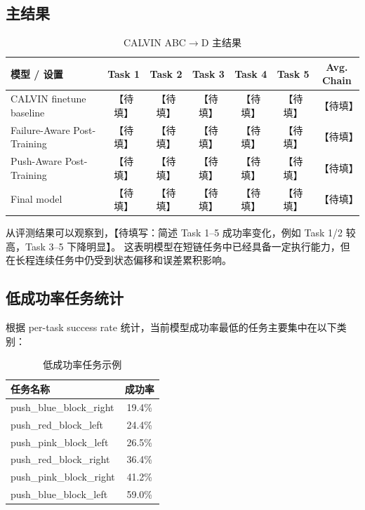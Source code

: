 \documentclass[10pt,a4paper,fontset=none]{ctexart}
\newcommand{\todo}[1]{\textcolor{TodoRed}{【#1】}}
\begin{document}
\subsection{主结果}

\begin{table}[H]
\centering
\caption{CALVIN ABC$\rightarrow$D 主结果}
\small
\begin{tabularx}{\textwidth}{>{\raggedright\arraybackslash}Xcccccc}
\toprule
模型 / 设置 & Task 1 & Task 2 & Task 3 & Task 4 & Task 5 & \makecell{Avg.\\Chain} \\
\midrule
CALVIN finetune baseline & \todo{待填} & \todo{待填} & \todo{待填} & \todo{待填} & \todo{待填} & \todo{待填} \\
Failure-Aware Post-Training & \todo{待填} & \todo{待填} & \todo{待填} & \todo{待填} & \todo{待填} & \todo{待填} \\
Push-Aware Post-Training & \todo{待填} & \todo{待填} & \todo{待填} & \todo{待填} & \todo{待填} & \todo{待填} \\
Final model & \todo{待填} & \todo{待填} & \todo{待填} & \todo{待填} & \todo{待填} & \todo{待填} \\
\bottomrule
\end{tabularx}
\end{table}

从评测结果可以观察到，\todo{待填写：简述 Task 1--5 成功率变化，例如 Task 1/2 较高，Task 3--5 下降明显}。
这表明模型在短链任务中已经具备一定执行能力，但在长程连续任务中仍受到状态偏移和误差累积影响。

\subsection{低成功率任务统计}

根据 per-task success rate 统计，当前模型成功率最低的任务主要集中在以下类别：

\begin{table}[H]
\centering
\caption{低成功率任务示例}
\begin{tabularx}{0.82\textwidth}{>{\ttfamily\raggedright\arraybackslash}X c}
\toprule
任务名称 & 成功率 \\
\midrule
push\_blue\_block\_right & 19.4\% \\
push\_red\_block\_left & 24.4\% \\
push\_pink\_block\_left & 26.5\% \\
push\_red\_block\_right & 36.4\% \\
push\_pink\_block\_right & 41.2\% \\
push\_blue\_block\_left & 59.0\% \\
\bottomrule
\end{tabularx}
\end{table}
\end{document}
